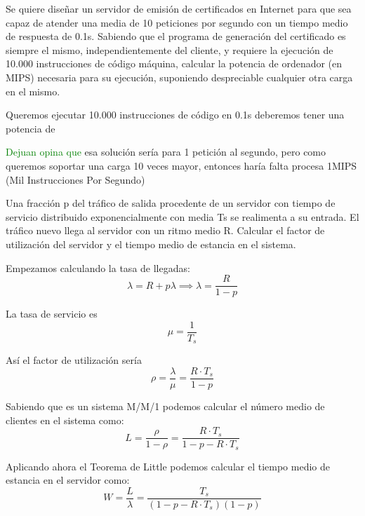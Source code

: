 
\begin{problem}[4]
Se quiere diseñar un servidor de emisión de certificados en Internet para que sea capaz de atender una media de 10 peticiones por segundo con un tiempo medio de respuesta de 0.1s. Sabiendo que el programa de generación del certificado es siempre el mismo, independientemente del cliente, y requiere la ejecución de 10.000 instrucciones de código máquina, calcular la potencia de ordenador (en MIPS) necesaria para su ejecución,
suponiendo despreciable cualquier otra carga en el mismo.

\solution

\yoP


Queremos ejecutar 10.000 instrucciones de código en 0.1s deberemos tener una potencia de 

\textcolor{green}{Dejuan opina que} esa solución sería para 1 petición al segundo, pero como queremos soportar una carga 10 veces mayor, entonces haría falta procesa 1MIPS (Mil Instrucciones Por Segundo)
\end{problem}


\begin{problem}[5]
Una fracción p del tráfico de salida procedente de un servidor con tiempo de servicio distribuido exponencialmente con media Ts se realimenta a su entrada. El tráfico nuevo llega al servidor con un ritmo medio R. Calcular el factor de utilización del servidor y el tiempo medio de estancia en el
sistema.

\solution

\yoP


Empezamos calculando la tasa de llegadas:
\[λ = R + pλ \implies λ = \frac{R}{1-p}\]

La tasa de servicio es
\[μ= \frac{1}{T_s}\]

Así el factor de utilización sería
\[ρ=\frac{λ}{μ}=\boxed{\frac{R \cdot T_s}{1-p}}\]

Sabiendo que es un sistema M/M/1 podemos calcular el número medio de clientes en el sistema como:
\[L = \frac{ρ}{1-ρ}=\frac{R\cdot T_s}{1-p-R\cdot T_s}\]

Aplicando ahora el Teorema de Little podemos calcular el tiempo medio de estancia en el servidor como:
\[W = \frac{L}{λ}=\boxed{\frac{T_s}{(1-p-R\cdot T_s)(1-p)}}\]

\end{problem}

